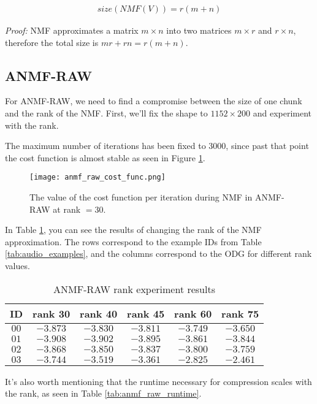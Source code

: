 \begin{align}
\label{equ:nmf_size}
size(NMF(V)) = r(m+n)
\end{align}

\emph{Proof:} NMF approximates a matrix $m \times n$ into two matrices $m \times r$ and $r \times n$, therefore the total size is $mr + rn = r(m+n)$.

\subsection{ANMF-RAW}
For ANMF-RAW, we need to find a compromise between the size of one chunk and the rank of the NMF. First, we'll fix the shape to $1152 \times 200$ and experiment with the rank.

The maximum number of iterations has been fixed to 3000, since past that point the cost function is almost stable as seen in Figure \ref{fig:anmf_raw_cost_func}.

\begin{figure}[ht]
	\caption[ANMF-RAW cost function]{The value of the cost function per iteration during NMF in ANMF-RAW at rank $= 30$.}
	\label{fig:anmf_raw_cost_func}
	\centering
	\texttt{[image: anmf\_raw\_cost\_func.png]}
\end{figure}

In Table \ref{tab:anmf_raw_rank}, you can see the results of changing the rank of the NMF approximation. The rows correspond to the example IDs from Table \ref{tab:audio_examples}, and the columns correspond to the ODG for different rank values.

\begin{table}[htbp]\caption{ANMF-RAW rank experiment results}
	\label{tab:anmf_raw_rank}
	\centering
	\begin{tabular}{|c|c|c|c|c|c|}
		\hline
		ID & rank 30 & rank 40 & rank 45 & rank 60 & rank 75 \\ \hline
		$00$ & $-3.873$ & $-3.830$ & $-3.811$ & $-3.749$ & $-3.650$ \\
		$01$ & $-3.908$ & $-3.902$ & $-3.895$ & $-3.861$ & $-3.844$ \\
		$02$ & $-3.868$ & $-3.850$ & $-3.837$ & $-3.800$ & $-3.759$ \\
		$03$ & $-3.744$ & $-3.519$ & $-3.361$ & $-2.825$ & $-2.461$ \\		
		\hline
	\end{tabular}
\end{table}

It's also worth mentioning that the runtime necessary for compression scales with the rank, as seen in Table \ref{tab:anmf_raw_runtime}.

